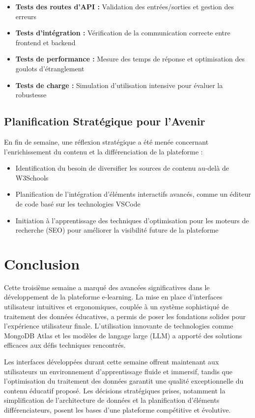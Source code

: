 \begin{itemize}
  \item \textbf{Tests des routes d'API :} Validation des entrées/sorties et gestion des erreurs
  \item \textbf{Tests d'intégration :} Vérification de la communication correcte entre frontend et backend
  \item \textbf{Tests de performance :} Mesure des temps de réponse et optimisation des goulots d'étranglement
  \item \textbf{Tests de charge :} Simulation d'utilisation intensive pour évaluer la robustesse
\end{itemize}

\subsection{Planification Stratégique pour l'Avenir}

En fin de semaine, une réflexion stratégique a été menée concernant l'enrichissement du contenu et la différenciation de la plateforme :

\begin{itemize}
  \item Identification du besoin de diversifier les sources de contenu au-delà de W3Schools
  \item Planification de l'intégration d'éléments interactifs avancés, comme un éditeur de code basé sur les technologies VSCode
  \item Initiation à l'apprentissage des techniques d'optimisation pour les moteurs de recherche (SEO) pour améliorer la visibilité future de la plateforme
\end{itemize}

\section{Conclusion}

Cette troisième semaine a marqué des avancées significatives dans le développement de la plateforme e-learning. La mise en place d'interfaces utilisateur intuitives et ergonomiques, couplée à un système sophistiqué de traitement des données éducatives, a permis de poser les fondations solides pour l'expérience utilisateur finale. L'utilisation innovante de technologies comme MongoDB Atlas et les modèles de langage large (LLM) a apporté des solutions efficaces aux défis techniques rencontrés.

Les interfaces développées durant cette semaine offrent maintenant aux utilisateurs un environnement d'apprentissage fluide et immersif, tandis que l'optimisation du traitement des données garantit une qualité exceptionnelle du contenu éducatif proposé. Les décisions stratégiques prises, notamment la simplification de l'architecture de données et la planification d'éléments différenciateurs, posent les bases d'une plateforme compétitive et évolutive. 